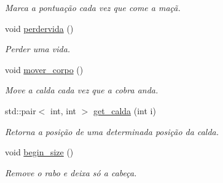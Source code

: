\begin{DoxyCompactItemize}
\begin{DoxyCompactList}\small\item\em Marca a pontuação cada vez que come a maçã. \end{DoxyCompactList}\item 
void \hyperlink{classSnaze_afd115b41dab7febbfbf56f7cbf207479}{perdervida} ()
\begin{DoxyCompactList}\small\item\em Perder uma vida. \end{DoxyCompactList}\item 
void \hyperlink{classSnaze_ade218832f4a4a1e69a6893f1cf2fea0e}{mover\+\_\+corpo} ()
\begin{DoxyCompactList}\small\item\em Move a calda cada vez que a cobra anda. \end{DoxyCompactList}\item 
std\+::pair$<$ int, int $>$ \hyperlink{classSnaze_aa3cfb02da86f2d37c632a6e4a720722e}{get\+\_\+calda} (int i)
\begin{DoxyCompactList}\small\item\em Retorna a posição de uma determinada posição da calda. \end{DoxyCompactList}\item 
void \hyperlink{classSnaze_ad9ec515cbd75483373a1919dd321b5ad}{begin\+\_\+size} ()
\begin{DoxyCompactList}\small\item\em Remove o rabo e deixa só a cabeça. \end{DoxyCompactList}\end{DoxyCompactItemize}

